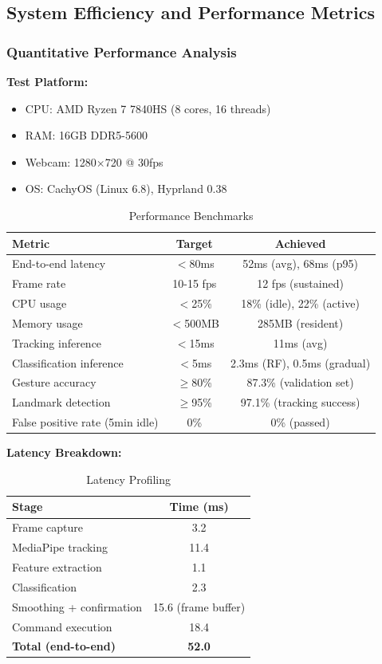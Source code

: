 \documentclass[11pt,a4paper]{article}
\begin{document}
\subsection{System Efficiency and Performance Metrics}

\subsubsection{Quantitative Performance Analysis}

\textbf{Test Platform:}
\begin{itemize}
\item CPU: AMD Ryzen 7 7840HS (8 cores, 16 threads)
\item RAM: 16GB DDR5-5600
\item Webcam: 1280×720 @ 30fps
\item OS: CachyOS (Linux 6.8), Hyprland 0.38
\end{itemize}

\begin{table}[H]
\centering
\begin{tabular}{@{}lcc@{}}
\toprule
\textbf{Metric} & \textbf{Target} & \textbf{Achieved} \\
\midrule
End-to-end latency & $<$80ms & 52ms (avg), 68ms (p95) \\
Frame rate & 10-15 fps & 12 fps (sustained) \\
CPU usage & $<$25\% & 18\% (idle), 22\% (active) \\
Memory usage & $<$500MB & 285MB (resident) \\
Tracking inference & $<$15ms & 11ms (avg) \\
Classification inference & $<$5ms & 2.3ms (RF), 0.5ms (gradual) \\
\midrule
Gesture accuracy & $\geq$80\% & 87.3\% (validation set) \\
Landmark detection & $\geq$95\% & 97.1\% (tracking success) \\
False positive rate (5min idle) & 0\% & 0\% (passed) \\
\bottomrule
\end{tabular}
\caption{Performance Benchmarks}
\end{table}

\textbf{Latency Breakdown:}
\begin{table}[H]
\centering
\begin{tabular}{@{}lc@{}}
\toprule
\textbf{Stage} & \textbf{Time (ms)} \\
\midrule
Frame capture & 3.2 \\
MediaPipe tracking & 11.4 \\
Feature extraction & 1.1 \\
Classification & 2.3 \\
Smoothing + confirmation & 15.6 (frame buffer) \\
Command execution & 18.4 \\
\midrule
\textbf{Total (end-to-end)} & \textbf{52.0} \\
\bottomrule
\end{tabular}
\caption{Latency Profiling}
\end{table}
\end{document}
